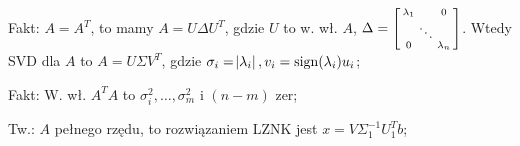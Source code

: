 \entry
Fakt:
$A=A^T$, to mamy $A=U\Delta U^T$, gdzie $U$ to w. wł. $A$,
$\Delta= \left[\begin{smallmatrix}
    \lambda_1   &           & 0 \\
                & \small\ddots    &   \\
    0           &           & \lambda_n
\end{smallmatrix}\right]
$.
Wtedy SVD dla $A$ to $A=U\Sigma V^T$, gdzie
$\sigma_i=\abs{\lambda_i}, v_i=\mathrm{sign}(\lambda_i)u_i$;

\entry
Fakt:
W. wł. $A^TA$ to $\sigma_i^2,\ldots,\sigma_m^2$ i $(n-m)$ zer;

\entry
Tw.:
$A$ pełnego rzędu, to rozwiązaniem LZNK jest $x=V\Sigma_1^{-1}U_1^Tb$;

